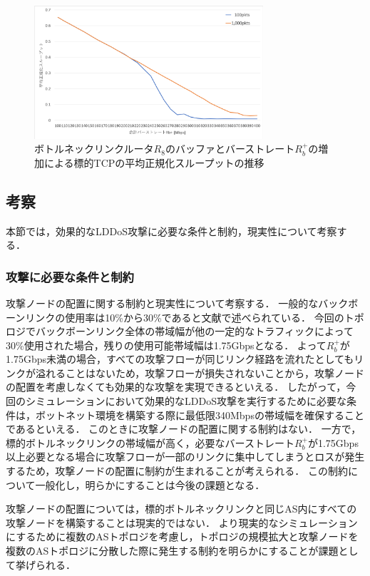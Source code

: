 \documentclass[Japanese]{dicomopapers}
\begin{document}
\begin{figure}[tb]
    \begin{center}
        \includegraphics[clip,width=8.5cm]{images/exp01-result.png}
        \caption{ボトルネックリンクルータ$R_{8}$のバッファとバーストレート$R_{b}^+$の増加による標的TCPの平均正規化スループットの推移}
        \label{fig:exp01-result}
    \end{center}
\end{figure}

\subsection{考察}
本節では，効果的なLDDoS攻撃に必要な条件と制約，現実性について考察する．

\subsubsection{攻撃に必要な条件と制約}
攻撃ノードの配置に関する制約と現実性について考察する．
一般的なバックボーンリンクの使用率は10\%から30\%であると文献\cite{sizing-router-buffers}で述べられている．
今回のトポロジでバックボーンリンク全体の帯域幅が他の一定的なトラフィックによって30\%使用された場合，残りの使用可能帯域幅は1.75Gbpsとなる．
よって$R_{b}^+$が1.75Gbps未満の場合，すべての攻撃フローが同じリンク経路を流れたとしてもリンクが溢れることはないため，攻撃フローが損失されないことから，攻撃ノードの配置を考慮しなくても効果的な攻撃を実現できるといえる．
したがって，今回のシミュレーションにおいて効果的なLDDoS攻撃を実行するために必要な条件は，ボットネット環境を構築する際に最低限340Mbpsの帯域幅を確保することであるといえる．
このときに攻撃ノードの配置に関する制約はない．
一方で，標的ボトルネックリンクの帯域幅が高く，必要なバーストレート$R_{b}^+$が1.75Gbps以上必要となる場合に攻撃フローが一部のリンクに集中してしまうとロスが発生するため，攻撃ノードの配置に制約が生まれることが考えられる．
この制約について一般化し，明らかにすることは今後の課題となる．

攻撃ノードの配置については，標的ボトルネックリンクと同じAS内にすべての攻撃ノードを構築することは現実的ではない．
より現実的なシミュレーションにするために複数のASトポロジを考慮し，トポロジの規模拡大と攻撃ノードを複数のASトポロジに分散した際に発生する制約を明らかにすることが課題として挙げられる．
\end{document}
